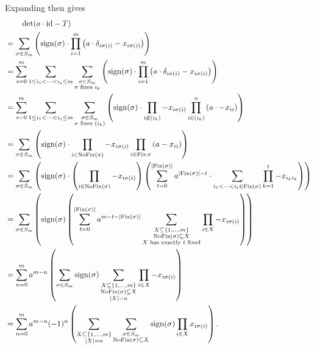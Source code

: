 \begin{problem}
\begin{sol}
		Expanding then gives
		\begin{align*}
			&\qquad \det (a \cdot \mathrm{id} - T) \\
			&= \sum_{\sigma \in S_m} \left( \operatorname{sign}(\sigma)
			\cdot \prod_{i=1}^m \left( a \cdot \delta_{i \sigma(i)} - x_{i \sigma(i)} \right)\right) \\
			&=
			\sum_{s=0}^m
			\sum_{1 \le i_1 < \dots < i_s \le m}
			\sum_{\substack{\sigma \in S_m \\ \sigma \text{ fixes } i_k}}
			\left( \operatorname{sign}(\sigma)
			\cdot \prod_{i=1}^m \left( a \cdot \delta_{i \sigma(i)} - x_{i \sigma(i)} \right)\right) \\
			&=
			\sum_{s=0}^m
			\sum_{1 \le i_1 < \dots < i_s \le m}
			\sum_{\substack{\sigma \in S_m \\ \sigma \text{ fixes } (i_k)}}
			\left( \operatorname{sign}(\sigma)
			\cdot \prod_{i \notin (i_k)} -x_{i \sigma(i)}
			\prod_{i \in (i_k)}^n \left( a \cdot - x_{ii} 
			\right)\right) \\
			&= 
			\sum_{\sigma \in S_m}
			\left( \operatorname{sign}(\sigma)
			\cdot \prod_{i \in \operatorname{NoFix}(\sigma)} -x_{i \sigma(i)}
			\prod_{i \in \operatorname{Fix}{\sigma}} \left( a - x_{ii} 
			\right)\right) \\
			&=
			\sum_{\sigma \in S_m}
			\left( \operatorname{sign}(\sigma)
			\cdot \left( \prod_{i \in \operatorname{NoFix}(\sigma)} -x_{i \sigma(i)} \right)
			\left( \sum_{t=0}^{\left\lvert \operatorname{Fix}(\sigma) \right\rvert}
			a^{\left\lvert \operatorname{Fix}(\sigma) \right\rvert - t} \cdot \sum_{i_1 < \dots < i_t \in \operatorname{Fix}(\sigma)}
			\prod_{k=1}^t -x_{i_ki_k} \right)
			\right) \\
			&=
			\sum_{\sigma \in S_m}
			\left( \operatorname{sign}(\sigma)
			\left( \sum_{t=0}^{\left\lvert \operatorname{Fix}(\sigma) \right\rvert}
			a^{m-t-\left\lvert \operatorname{Fix}(\sigma) \right\rvert} 
			\sum_{\substack{X \subseteq \{1, \dots, m\} \\ \operatorname{NoFix}(\sigma) \subseteq X \\ X \text{ has exactly $t$ fixed}}} \prod_{i \in X} -x_{i \sigma(i)}
			\right) \right) \\
			&= 
			\sum_{n=0}^m
			a^{m-n}
			\left(
			\sum_{\sigma \in S_m}
			\operatorname{sign}(\sigma)
			\sum_{\substack{X \subseteq \{1, \dots, m\} \\ \operatorname{NoFix}(\sigma) \subseteq X \\ \left\lvert X \right\rvert = n} }
			\prod_{i \in X} -x_{i \sigma(i)}
			\right) \\
			&= \sum_{n=0}^m
			a^{m-n} (-1)^n
			\left(
			\sum_{\substack{X \subseteq \{1, \dots, m\} \\ \left\lvert X \right\rvert = n} }
			\sum_{\substack{\sigma \in S_m \\ \operatorname{NoFix}(\sigma) \subseteq X}}
			\operatorname{sign}(\sigma) \prod_{i \in X} x_{i \sigma(i)}
			\right).
		\end{align*}


\end{sol}
\end{problem}
